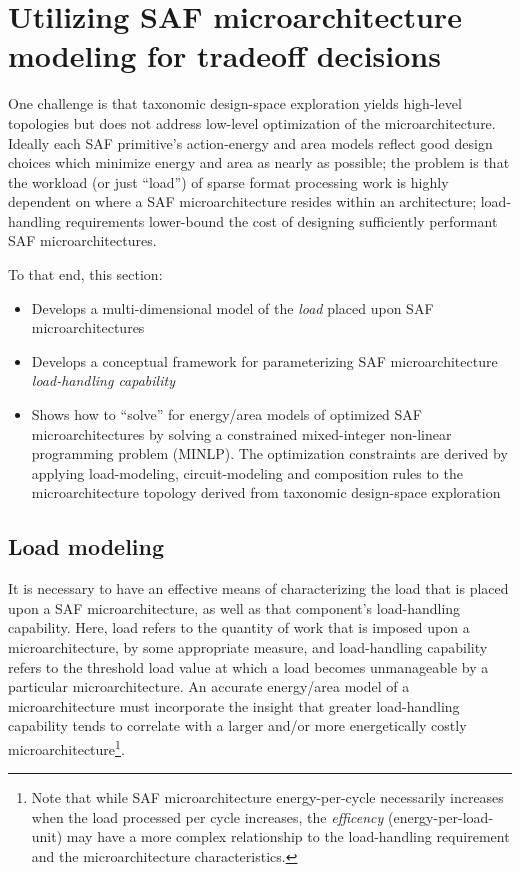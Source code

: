 \section{Utilizing SAF microarchitecture modeling for tradeoff decisions}



One challenge is that taxonomic design-space exploration yields high-level topologies but does not address low-level optimization of the microarchitecture. Ideally each SAF primitive's action-energy and area models reflect good design choices which minimize energy and area as nearly as possible; the problem is that the workload (or just ``load'') of sparse format processing work is highly dependent on where a SAF microarchitecture resides within an architecture; load-handling requirements lower-bound the cost of designing sufficiently performant SAF microarchitectures.

To that end, this section:

\begin{itemize}
    \item Develops a multi-dimensional model of the \textit{load} placed upon SAF microarchitectures
    \item Develops a conceptual framework for parameterizing SAF microarchitecture \textit{load-handling capability}
    \item Shows how to ``solve'' for energy/area models of optimized SAF microarchitectures by solving a constrained mixed-integer non-linear programming problem (MINLP). The optimization constraints are derived by applying load-modeling, circuit-modeling and composition rules to the microarchitecture topology derived from taxonomic design-space exploration
\end{itemize}

\subsection{Load modeling}

It is necessary to have an effective means of characterizing the load that is placed upon a SAF microarchitecture, as well as that component's load-handling capability. Here, load refers to the quantity of work that is imposed upon a microarchitecture, by some appropriate measure, and load-handling capability refers to the threshold load value at which a load becomes unmanageable by a particular microarchitecture. An accurate energy/area model of a microarchitecture must incorporate the insight that greater load-handling capability tends to correlate with a larger and/or more energetically costly microarchitecture\footnote{Note that while SAF microarchitecture energy-per-cycle necessarily increases when the load processed per cycle increases, the \textit{efficency} (energy-per-load-unit) may have a more complex relationship to the load-handling requirement and the microarchitecture characteristics.}.


